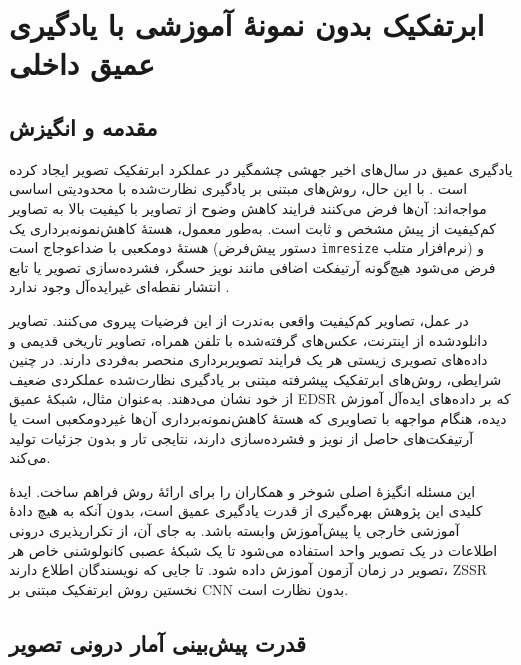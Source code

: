 \section{ابرتفکیک بدون نمونهٔ آموزشی با یادگیری عمیق داخلی}
\label{sec:zssr}

\subsection{مقدمه و انگیزش}
\label{subsec:zssr_intro}

یادگیری عمیق در سال‌های اخیر جهشی چشمگیر در عملکرد ابرتفکیک تصویر
ایجاد کرده است \cite{dong2014srcnn, kim2016vdsr, lim2017edsr, ledig2017srgan}.
با این حال، روش‌های مبتنی بر یادگیری نظارت‌شده با محدودیتی اساسی
مواجه‌اند: آن‌ها فرض می‌کنند فرایند کاهش وضوح از تصاویر با کیفیت بالا
به تصاویر کم‌کیفیت
از پیش مشخص و ثابت است. به‌طور معمول، هستهٔ
کاهش‌نمونه‌برداری یک هستهٔ دومکعبی
با ضد‌اعوجاج است (دستور پیش‌فرض \texttt{imresize} نرم‌افزار متلب)
و فرض می‌شود هیچ‌گونه آرتیفکت اضافی مانند نویز حسگر، فشرده‌سازی تصویر
یا تابع انتشار نقطه‌ای غیرایده‌آل
وجود ندارد \cite{shocher2018zssr}.

در عمل، تصاویر کم‌کیفیت واقعی به‌ندرت از این فرضیات پیروی می‌کنند.
تصاویر دانلود‌شده از اینترنت، عکس‌های گرفته‌شده با تلفن همراه، تصاویر
تاریخی قدیمی و داده‌های تصویری زیستی هر یک فرایند تصویربرداری منحصر
به‌فردی دارند. در چنین شرایطی، روش‌های ابرتفکیک پیشرفته مبتنی بر
یادگیری نظارت‌شده عملکردی ضعیف از خود نشان می‌دهند. به‌عنوان مثال،
شبکهٔ عمیق EDSR \cite{lim2017edsr} که بر داده‌های ایده‌آل آموزش دیده،
هنگام مواجهه با تصاویری که هستهٔ کاهش‌نمونه‌برداری آن‌ها غیردومکعبی
است یا آرتیفکت‌های حاصل از نویز و فشرده‌سازی دارند، نتایجی تار و
بدون جزئیات تولید می‌کند.

این مسئله انگیزهٔ اصلی شوخر و همکاران \cite{shocher2018zssr} را برای
ارائهٔ روش  فراهم ساخت.
ایدهٔ کلیدی این پژوهش بهره‌گیری از قدرت یادگیری عمیق است، بدون آنکه
به هیچ دادهٔ آموزشی خارجی یا پیش‌آموزش وابسته باشد. به جای آن، از
تکرارپذیری درونی اطلاعات در یک تصویر واحد استفاده می‌شود تا یک شبکهٔ
عصبی کانولوشنی خاص هر تصویر در زمان آزمون آموزش داده شود. تا جایی که
نویسندگان اطلاع دارند، ZSSR نخستین روش ابرتفکیک مبتنی بر CNN بدون
نظارت است.

\subsection{قدرت پیش‌بینی آمار درونی تصویر}
\label{subsec:internal_stats}


